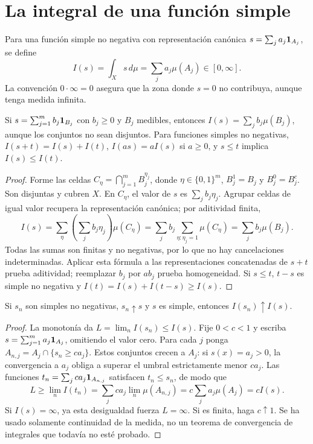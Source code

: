 \section{La integral de una función simple}\label{lectura:v2-08}
\begin{definicion}
Para una función simple no negativa con representación canónica $s=\sum_ja_j\mathbf1_{A_j}$, se define
\[I(s)=\int_Xs\,d\mu=\sum_ja_j\mu(A_j)\in[0,\infty].\]
La convención $0\cdot\infty=0$ asegura que la zona donde $s=0$ no contribuya, aunque tenga medida infinita.
\end{definicion}
\begin{proposicion}\label{prop:v2-integralsimple}
Si $s=\sum_{j=1}^mb_j\mathbf1_{B_j}$ con $b_j\ge0$ y $B_j$ medibles, entonces $I(s)=\sum_jb_j\mu(B_j)$, aunque los conjuntos no sean disjuntos. Para funciones simples no negativas, $I(s+t)=I(s)+I(t)$, $I(as)=aI(s)$ si $a\ge0$, y $s\le t$ implica $I(s)\le I(t)$.
\end{proposicion}
\begin{proof}
Forme las celdas $C_\eta=\bigcap_{j=1}^mB_j^{\eta_j}$, donde $\eta\in\{0,1\}^m$, $B_j^1=B_j$ y $B_j^0=B_j^c$. Son disjuntas y cubren $X$. En $C_\eta$, el valor de $s$ es $\sum_jb_j\eta_j$. Agrupar celdas de igual valor recupera la representación canónica; por aditividad finita,
\[I(s)=\sum_\eta\left(\sum_jb_j\eta_j\right)\mu(C_\eta)
=\sum_jb_j\sum_{\eta:\eta_j=1}\mu(C_\eta)
=\sum_jb_j\mu(B_j).\]
Todas las sumas son finitas y no negativas, por lo que no hay cancelaciones indeterminadas. Aplicar esta fórmula a las representaciones concatenadas de $s+t$ prueba aditividad; reemplazar $b_j$ por $ab_j$ prueba homogeneidad. Si $s\le t$, $t-s$ es simple no negativa y $I(t)=I(s)+I(t-s)\ge I(s)$.
\end{proof}

\begin{lema}\label{lema:v2-limitesimple}
Si $s_n$ son simples no negativas, $s_n\uparrow s$ y $s$ es simple, entonces $I(s_n)\uparrow I(s)$.
\end{lema}
\begin{proof}
La monotonía da $L=\lim_nI(s_n)\le I(s)$. Fije $0<c<1$ y escriba $s=\sum_{j=1}^ma_j\mathbf1_{A_j}$, omitiendo el valor cero. Para cada $j$ ponga $A_{n,j}=A_j\cap\{s_n\ge ca_j\}$. Estos conjuntos crecen a $A_j$: si $s(x)=a_j>0$, la convergencia a $a_j$ obliga a superar el umbral estrictamente menor $ca_j$. Las funciones $t_n=\sum_jca_j\mathbf1_{A_{n,j}}$ satisfacen $t_n\le s_n$, de modo que
\[L\ge\lim_nI(t_n)=\sum_jca_j\lim_n\mu(A_{n,j})=c\sum_ja_j\mu(A_j)=cI(s).\]
Si $I(s)=\infty$, ya esta desigualdad fuerza $L=\infty$. Si es finita, haga $c\uparrow1$. Se ha usado solamente continuidad de la medida, no un teorema de convergencia de integrales que todavía no esté probado.
\end{proof}


